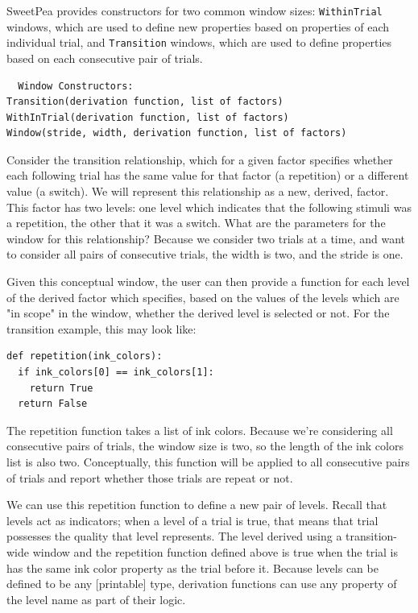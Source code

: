 SweetPea provides constructors for two common window sizes: \texttt{WithinTrial} windows, which are used to define new properties based on properties of each individual trial, and \texttt{Transition} windows, which are used to define properties based on each consecutive pair of trials.

\begin{verbatim}
  Window Constructors:
Transition(derivation function, list of factors)
WithInTrial(derivation function, list of factors)
Window(stride, width, derivation function, list of factors)
\end{verbatim}

Consider the transition relationship, which for a given factor specifies whether each following trial has the same value for that factor (a repetition) or a different value (a switch). We will represent this relationship as a new, derived, factor. This factor has two levels: one level which indicates that the following stimuli was a repetition, the other that it was a switch. What are the parameters for the window for this relationship? Because we consider two trials at a time, and want to consider all pairs of consecutive trials, the width is two, and the stride is one.

Given this conceptual window, the user can then provide a function for each level of the derived factor which specifies, based on the values of the levels which are "in scope" in the window, whether the derived level is selected or not. For the transition example, this may look like:

\begin{verbatim}
def repetition(ink_colors):
  if ink_colors[0] == ink_colors[1]:
    return True
  return False
\end{verbatim}

The repetition function takes a list of ink colors. Because we're considering all consecutive pairs of trials, the window size is two, so the length of the ink colors list is also two. Conceptually, this function will be applied to all consecutive pairs of trials and report whether those trials are repeat or not.

We can use this repetition function to define a new pair of levels. Recall that levels act as indicators; when a level of a trial is true, that means that trial possesses the quality that level represents. The level derived using a transition-wide window and the repetition function defined above is true when the trial is has the same ink color property as the trial before it. Because levels can be defined to be any [printable] type, derivation functions can use any property of the level name as part of their logic.

